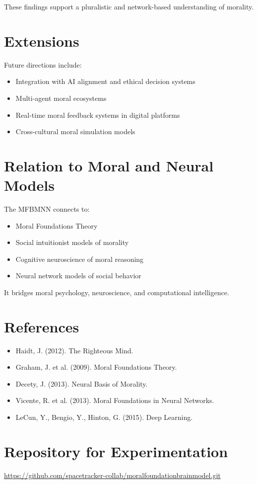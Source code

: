 \documentclass[12pt]{article}
\begin{document}
These findings support a pluralistic and network-based understanding of morality.

\section{Extensions}

Future directions include:

\begin{itemize}
\item Integration with AI alignment and ethical decision systems
\item Multi-agent moral ecosystems
\item Real-time moral feedback systems in digital platforms
\item Cross-cultural moral simulation models
\end{itemize}

\section{Relation to Moral and Neural Models}

The MFBMNN connects to:

\begin{itemize}
\item Moral Foundations Theory
\item Social intuitionist models of morality
\item Cognitive neuroscience of moral reasoning
\item Neural network models of social behavior
\end{itemize}

It bridges moral psychology, neuroscience, and computational intelligence.

\section{References}

\begin{itemize}
\item Haidt, J. (2012). The Righteous Mind.
\item Graham, J. et al. (2009). Moral Foundations Theory.
\item Decety, J. (2013). Neural Basis of Morality.
\item Vicente, R. et al. (2013). Moral Foundations in Neural Networks.
\item LeCun, Y., Bengio, Y., Hinton, G. (2015). Deep Learning.
\end{itemize}

\section{Repository for Experimentation}

\noindent
\url{https://github.com/spacetracker-collab/moralfoundationbrainmodel.git}
\end{document}
